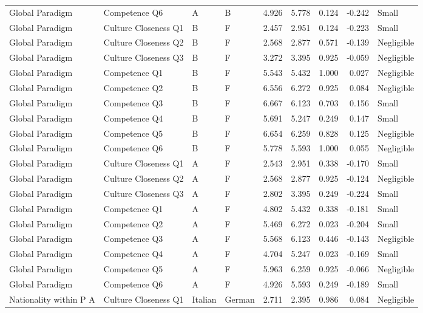 \begin{table}
\begin{tabular}{llllrrrrl}
Global  Paradigm & Competence  Q6 & A & B & 4.926 & 5.778 & 0.124 & -0.242 & Small \\
Global  Paradigm & Culture  Closeness  Q1 & B & F & 2.457 & 2.951 & 0.124 & -0.223 & Small \\
Global  Paradigm & Culture  Closeness  Q2 & B & F & 2.568 & 2.877 & 0.571 & -0.139 & Negligible \\
Global  Paradigm & Culture  Closeness  Q3 & B & F & 3.272 & 3.395 & 0.925 & -0.059 & Negligible \\
Global  Paradigm & Competence  Q1 & B & F & 5.543 & 5.432 & 1.000 & 0.027 & Negligible \\
Global  Paradigm & Competence  Q2 & B & F & 6.556 & 6.272 & 0.925 & 0.084 & Negligible \\
Global  Paradigm & Competence  Q3 & B & F & 6.667 & 6.123 & 0.703 & 0.156 & Small \\
Global  Paradigm & Competence  Q4 & B & F & 5.691 & 5.247 & 0.249 & 0.147 & Small \\
Global  Paradigm & Competence  Q5 & B & F & 6.654 & 6.259 & 0.828 & 0.125 & Negligible \\
Global  Paradigm & Competence  Q6 & B & F & 5.778 & 5.593 & 1.000 & 0.055 & Negligible \\
Global  Paradigm & Culture  Closeness  Q1 & A & F & 2.543 & 2.951 & 0.338 & -0.170 & Small \\
Global  Paradigm & Culture  Closeness  Q2 & A & F & 2.568 & 2.877 & 0.925 & -0.124 & Negligible \\
Global  Paradigm & Culture  Closeness  Q3 & A & F & 2.802 & 3.395 & 0.249 & -0.224 & Small \\
Global  Paradigm & Competence  Q1 & A & F & 4.802 & 5.432 & 0.338 & -0.181 & Small \\
Global  Paradigm & Competence  Q2 & A & F & 5.469 & 6.272 & 0.023 & -0.204 & Small \\
Global  Paradigm & Competence  Q3 & A & F & 5.568 & 6.123 & 0.446 & -0.143 & Negligible \\
Global  Paradigm & Competence  Q4 & A & F & 4.704 & 5.247 & 0.023 & -0.169 & Small \\
Global  Paradigm & Competence  Q5 & A & F & 5.963 & 6.259 & 0.925 & -0.066 & Negligible \\
Global  Paradigm & Competence  Q6 & A & F & 4.926 & 5.593 & 0.249 & -0.189 & Small \\
Nationality  within  P  A & Culture  Closeness  Q1 & Italian & German & 2.711 & 2.395 & 0.986 & 0.084 & Negligible \\

\end{tabular}
\end{table}
